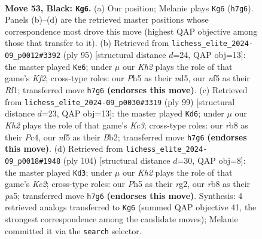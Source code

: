 \documentclass[11pt]{article}
\begin{document}
\clearpage

\begin{figure}[p]\centering
\begin{subfigure}{0.46\textwidth}\centering
\resizebox{\linewidth}{!}{%
\newchessgame
\chessboard[
  setfen={1R6/6pk/5p2/5N1p/3P3P/r5P1/5K2/8 b - - 0 53},
  showmover=false,
  pgfstyle=straightmove, color=movearrow, markmove={h7-g6}
]}
\caption{}
\end{subfigure}\hfill
\begin{subfigure}{0.46\textwidth}\centering
\resizebox{\linewidth}{!}{%
\newchessgame
\chessboard[
  setfen={8/p4kp1/8/3N2P1/1P3P2/4K3/8/5r2 b - - 2 48},
  showmover=false,
  pgfstyle=straightmove, color=movearrow, markmove={f7-e6}
]}
\caption{}
\end{subfigure}
\\[4pt]
\begin{subfigure}{0.46\textwidth}\centering
\resizebox{\linewidth}{!}{%
\newchessgame
\chessboard[
  setfen={8/8/p1k5/1p6/1Pp1PK2/P7/1bN5/8 b - - 3 50},
  showmover=false,
  pgfstyle=straightmove, color=movearrow, markmove={c6-d6}
]}
\caption{}
\end{subfigure}\hfill
\begin{subfigure}{0.46\textwidth}\centering
\resizebox{\linewidth}{!}{%
\newchessgame
\chessboard[
  setfen={8/4k3/1p1p1p2/p7/4n3/2P5/1PK3rP/8 w - - 0 53},
  showmover=false,
  pgfstyle=straightmove, color=movearrow, markmove={c2-d3}
]}
\caption{}
\end{subfigure}
\caption{\textbf{Move 53, Black: \texttt{Kg6}.} (a) Our position; Melanie plays \texttt{Kg6} (\texttt{h7g6}). Panels (b)--(d) are the retrieved master positions whose correspondence most drove this move (highest QAP objective among those that transfer to it). (b) Retrieved from \texttt{lichess\_elite\_2024-09\_p0012\#3392} (ply 95) [structural distance $d$=24, QAP obj=13]: the master played \texttt{Ke6}; under $\mu$ our \emph{Kh2} plays the role of that game's \emph{Kf2}; cross-type roles: our \emph{P}h5 as their \emph{n}d5, our \emph{n}f5 as their \emph{R}f1; transferred move \texttt{h7g6} \textbf{(endorses this move)}. (c) Retrieved from \texttt{lichess\_elite\_2024-09\_p0030\#3319} (ply 99) [structural distance $d$=23, QAP obj=13]: the master played \texttt{Kd6}; under $\mu$ our \emph{Kh2} plays the role of that game's \emph{Kc3}; cross-type roles: our \emph{r}b8 as their \emph{P}c4, our \emph{n}f5 as their \emph{B}b2; transferred move \texttt{h7g6} \textbf{(endorses this move)}. (d) Retrieved from \texttt{lichess\_elite\_2024-09\_p0018\#1948} (ply 104) [structural distance $d$=30, QAP obj=8]: the master played \texttt{Kd3}; under $\mu$ our \emph{Kh2} plays the role of that game's \emph{Kc2}; cross-type roles: our \emph{P}h5 as their \emph{r}g2, our \emph{r}b8 as their \emph{p}a5; transferred move \texttt{h7g6} \textbf{(endorses this move)}. Synthesis: 4 retrieved analogs transferred to \texttt{Kg6} (summed QAP objective 41, the strongest correspondence among the candidate moves); Melanie committed it via the \texttt{search} selector.}
\label{fig:thought-m105}
\end{figure}
\end{document}
